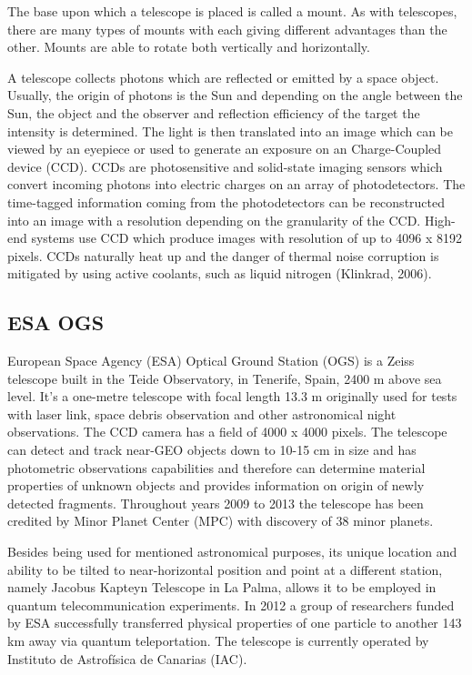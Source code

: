 	The base upon which a telescope is placed is called a mount. As with telescopes, there are many types of mounts with each giving different advantages than the other. Mounts are able to rotate both vertically and horizontally.
	
	A telescope collects photons which are reflected or emitted by a space object. Usually, the origin of photons is the Sun and depending on the angle between the Sun, the object and the observer and reflection efficiency of the target the intensity is determined. The light is then translated into an image which can be viewed by an eyepiece or used to generate an exposure on an Charge-Coupled device (CCD). CCDs are photosensitive and solid-state imaging sensors which convert incoming photons into electric charges on an array of photodetectors. The time-tagged information coming from the photodetectors can be reconstructed into an image with a resolution depending on the granularity of the CCD. High-end systems use CCD which produce images with resolution of up to 4096 x 8192 pixels. CCDs naturally heat up and the danger of thermal noise corruption is mitigated by using active coolants, such as liquid nitrogen (Klinkrad, 2006).

\subsection{ESA OGS}\label{subsec:esa_ogs}
European Space Agency (ESA) Optical Ground Station (OGS) is a Zeiss telescope built in the Teide Observatory, in Tenerife, Spain, 2400 m above sea level. It’s a one-metre telescope with focal length 13.3 m originally used for tests with laser link, space debris observation and other astronomical night observations. The CCD camera has a field of 4000 x 4000 pixels. The telescope can detect and track near-GEO objects down to 10-15 cm in size and has photometric observations capabilities and therefore can determine material properties of unknown objects and provides information on origin of newly detected fragments. Throughout years 2009 to 2013 the telescope has been credited by Minor Planet Center (MPC) with discovery of 38 minor planets.
 
	Besides being used for mentioned astronomical purposes, its unique location and ability to be tilted to near-horizontal position and point at a different station, namely Jacobus Kapteyn Telescope in La Palma, allows it to be employed in quantum telecommunication experiments. In 2012 a group of researchers funded by ESA successfully transferred physical properties of one particle to another 143 km away via quantum teleportation. The telescope is currently operated by Instituto de Astrofísica de Canarias (IAC).

